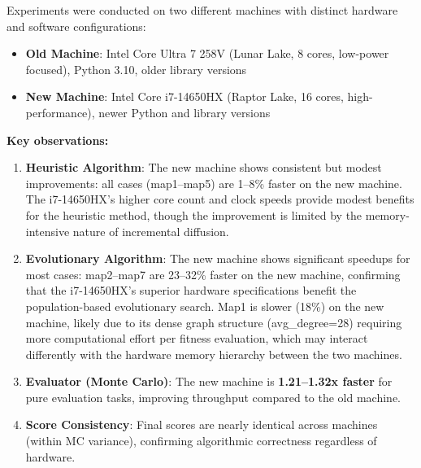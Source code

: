 \documentclass[onecolumn,a4paper,12pt]{IEEEtran}
\begin{document}
Experiments were conducted on two different machines with distinct hardware and software configurations:

\begin{itemize}
    \item \textbf{Old Machine}: Intel Core Ultra 7 258V (Lunar Lake, 8 cores, low-power focused), Python 3.10, older library versions
    \item \textbf{New Machine}: Intel Core i7-14650HX (Raptor Lake, 16 cores, high-performance), newer Python and library versions
\end{itemize}

\textbf{Key observations:}

\begin{enumerate}
    \item \textbf{Heuristic Algorithm}: The new machine shows consistent but modest improvements: all cases (map1--map5) are 1--8\% faster on the new machine. The i7-14650HX's higher core count and clock speeds provide modest benefits for the heuristic method, though the improvement is limited by the memory-intensive nature of incremental diffusion.

    \item \textbf{Evolutionary Algorithm}: The new machine shows significant speedups for most cases: map2--map7 are 23--32\% faster on the new machine, confirming that the i7-14650HX's superior hardware specifications benefit the population-based evolutionary search. Map1 is slower (18\%) on the new machine, likely due to its dense graph structure (avg\_degree=28) requiring more computational effort per fitness evaluation, which may interact differently with the hardware memory hierarchy between the two machines.

    \item \textbf{Evaluator (Monte Carlo)}: The new machine is \textbf{1.21--1.32x faster} for pure evaluation tasks, improving throughput compared to the old machine.

    \item \textbf{Score Consistency}: Final scores are nearly identical across machines (within MC variance), confirming algorithmic correctness regardless of hardware.
\end{enumerate}
\end{document}

